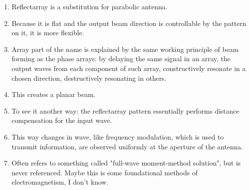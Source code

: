 \documentclass{article}
\begin{document}
    \begin{enumerate}
        \item Reflectarray is a substitution for parabolic antenna.
        \item Because it is flat and the output beam direction is controllable by the pattern on it, it is more flexible.
        \item Array part of the name is explained by the same working principle of beam forming as the phase arrays: by delaying the same signal in an array, the output waves from each component of such array, constructively resonate in a chosen direction, destructively resonating in others.
        \item This creates a planar beam.
        \item To see it another way: the reflectarray pattern essentially performs distance compensation for the input wave.
        \item This way changes in wave, like frequency modulation, which is used to transmit information, are observed uniformly at the aperture of the antenna.
        \item Often refers to something called "full-wave moment-method solution", but is never referenced.
        Maybe this is some foundational methods of electromagnetism, I don't know.
    \end{enumerate}
\end{document}
